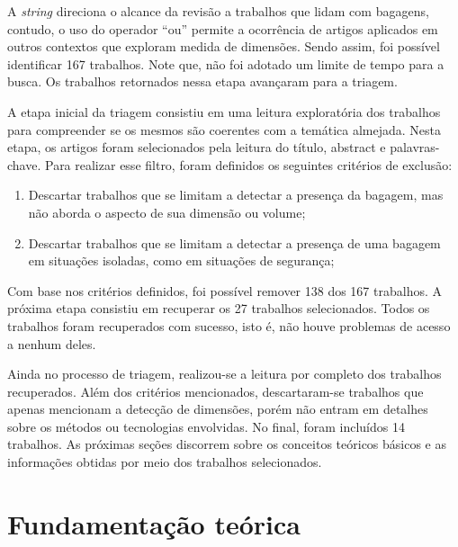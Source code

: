     A \textit{string} direciona o alcance da revisão a trabalhos que lidam com bagagens, contudo, o uso do operador “ou” permite a ocorrência de artigos aplicados em outros contextos que exploram medida de dimensões. Sendo assim, foi possível identificar 167 trabalhos. Note que, não foi adotado um limite de tempo para a busca. Os trabalhos retornados nessa etapa avançaram para a triagem.



    A etapa inicial da triagem consistiu em uma leitura exploratória dos trabalhos para compreender se os mesmos são coerentes com a temática almejada. Nesta etapa, os artigos foram selecionados pela leitura do título, abstract e palavras-chave. Para realizar esse filtro, foram definidos os seguintes critérios de exclusão:

    \begin{enumerate}
        \item Descartar trabalhos que se limitam a detectar a presença da bagagem, mas não aborda o aspecto de sua dimensão ou volume;
        \item Descartar trabalhos que se limitam a detectar a presença de uma bagagem em situações isoladas, como em situações de segurança;
    \end{enumerate}

    Com base nos critérios definidos, foi possível remover 138 dos 167 trabalhos. A próxima etapa consistiu em recuperar os 27 trabalhos selecionados. Todos os trabalhos foram recuperados com sucesso, isto é, não houve problemas de acesso a nenhum deles. 

    Ainda no processo de triagem, realizou-se a leitura por completo dos trabalhos recuperados. Além dos critérios mencionados, descartaram-se trabalhos que apenas mencionam a detecção de dimensões, porém não entram em detalhes sobre os métodos ou tecnologias envolvidas. No final, foram incluídos 14 trabalhos. As próximas seções discorrem sobre os conceitos teóricos básicos e as informações obtidas por meio dos trabalhos selecionados.

\section{Fundamentação teórica}
\label{sec_Fundamentacao_teorica}

